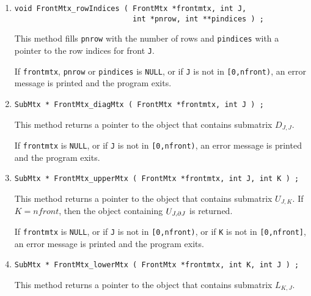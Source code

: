 \begin{enumerate}
an error message is printed and the program exits.
\item
\begin{verbatim}
void FrontMtx_rowIndices ( FrontMtx *frontmtx, int J,
                           int *pnrow, int **pindices ) ;
\end{verbatim}
This method fills {\tt *pnrow} with the number of rows
and {\tt *pindices} with a pointer to the row indices for front
{\tt J}.
\par {}
If {\tt frontmtx}, {\tt pnrow} or {\tt pindices} is {\tt NULL},
or if {\tt J} is not in {\tt [0,nfront)},
an error message is printed and the program exits.
\item
\begin{verbatim}
SubMtx * FrontMtx_diagMtx ( FrontMtx *frontmtx, int J ) ;
\end{verbatim}
This method returns a pointer to the object that contains
submatrix $D_{J,J}$.
\par {}
If {\tt frontmtx} is {\tt NULL},
or if {\tt J} is not in {\tt [0,nfront)},
an error message is printed and the program exits.
\item
\begin{verbatim}
SubMtx * FrontMtx_upperMtx ( FrontMtx *frontmtx, int J, int K ) ;
\end{verbatim}
This method returns a pointer to the object that contains
submatrix $U_{J,K}$.
If $K = nfront$, then the object containing $U_{J,{\partial{J}}}$ is
returned.
\par {}
If {\tt frontmtx} is {\tt NULL},
or if {\tt J} is not in {\tt [0,nfront)},
or if {\tt K} is not in {\tt [0,nfront]},
an error message is printed and the program exits.
\item
\begin{verbatim}
SubMtx * FrontMtx_lowerMtx ( FrontMtx *frontmtx, int K, int J ) ;
\end{verbatim}
This method returns a pointer to the object that contains
submatrix $L_{K,J}$.

\end{enumerate}

